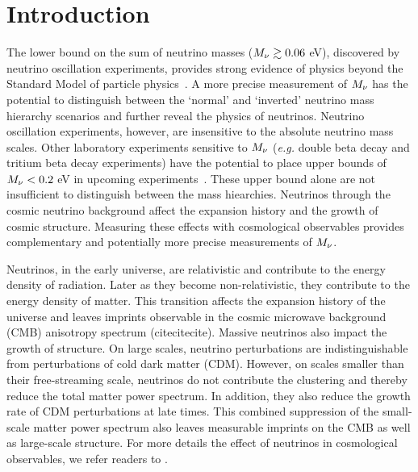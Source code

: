 \section{Introduction}
The lower bound on the sum of neutrino masses ($M_\nu \gtrsim 0.06$ eV), 
discovered by neutrino oscillation experiments, provides strong evidence of 
physics beyond the Standard Model of particle physics~\citep{forero2014, gonzalez-garcia2016}. 
A more precise measurement of $M_\nu$ has the potential to distinguish 
between the `normal' and `inverted' neutrino mass hierarchy scenarios 
and further reveal the physics of neutrinos. Neutrino oscillation 
experiments, however, are insensitive to the absolute neutrino mass scales. 
Other laboratory experiments sensitive to $M_\nu$ (\emph{e.g.} double beta 
decay and tritium beta decay experiments) have the potential to place upper 
bounds of $M_\nu < 0.2$ eV in upcoming experiments~\citep[]{drexlin2013}. 
These upper bound alone are not insufficient to distinguish between the mass
hiearchies. Neutrinos through the cosmic neutrino background affect the 
expansion history and the growth of cosmic structure. Measuring these effects 
with cosmological observables provides complementary and potentially more 
precise measurements of $M_\nu$. 

Neutrinos, in the early universe, are relativistic and contribute to the 
energy density of radiation. Later as they become non-relativistic, 
they contribute to the energy density of matter. This transition affects 
the expansion history of the universe and leaves imprints observable in 
the cosmic microwave background (CMB) anisotropy spectrum (citecitecite). 
Massive neutrinos also impact the growth of structure. On large scales, 
neutrino perturbations are indistinguishable from perturbations of cold 
dark matter (CDM). However, on scales smaller than their free-streaming 
scale, neutrinos do not contribute the clustering and thereby reduce the
total matter power spectrum. In addition, they also reduce the growth 
rate of CDM perturbations at late times. This combined suppression of 
the small-scale matter power spectrum also leaves measurable imprints 
on the CMB as well as large-scale structure. For more details the effect
of neutrinos in cosmological observables, we refer readers to 
\cite{lesgourgues2012,lesgourgues2014,gerbino2018}. 

